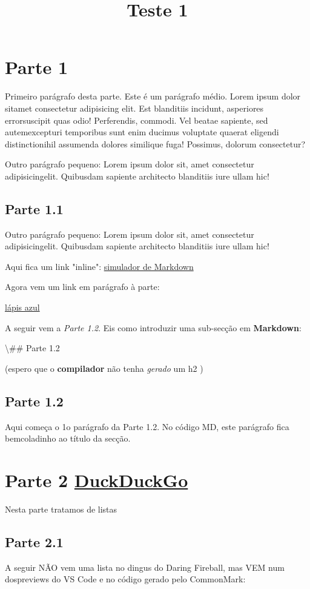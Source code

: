 \documentclass{article}
\title{Teste 1}
\date{}
\begin{document}
\maketitle
\section*{Parte 1}
Primeiro parágrafo desta parte. Este é um parágrafo médio. Lorem ipsum dolor sitamet consectetur adipisicing elit. Est blanditiis incidunt, asperiores errorsuscipit quas odio! Perferendis, commodi. Vel beatae sapiente, sed autemexcepturi temporibus sunt enim ducimus voluptate quaerat eligendi distinctionihil assumenda dolores similique fuga! Possimus, dolorum consectetur?

Outro parágrafo pequeno: Lorem ipsum dolor sit, amet consectetur adipisicingelit. Quibusdam sapiente architecto blanditiis iure ullam hic!

\subsection*{Parte 1.1}
Outro parágrafo pequeno: Lorem ipsum dolor sit, amet consectetur adipisicingelit. Quibusdam sapiente architecto blanditiis iure ullam hic!

Aqui fica um link "inline": \href{http://daringfireball.net/projects/markdown/dingus}{simulador de Markdown}

Agora vem um link em parágrafo à parte:

\href{https://twitter.com/}{lápis azul}

A seguir vem a \textit{Parte 1.2}. Eis como introduzir uma sub-secção em \textbf{Markdown}:

\textbackslash{}\#\# Parte 1.2

(espero que o \textbf{compilador} não tenha \textit{gerado} um h2 )

\subsection*{Parte 1.2}
Aqui começa o 1o parágrafo da Parte 1.2. No código MD, este parágrafo fica bemcoladinho ao título da secção.

\section*{Parte 2 \href{https://duckduckgo.com}{DuckDuckGo}}
Nesta parte tratamos de listas

\subsection*{Parte 2.1}
A seguir NÃO vem uma lista no dingus do Daring Fireball, mas VEM num dospreviews do VS Code e no código gerado pelo CommonMark:
\end{document}
